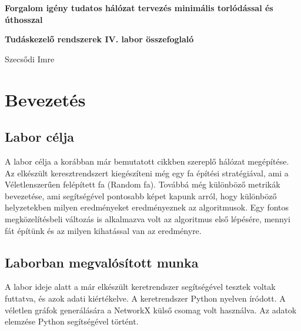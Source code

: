 \documentclass[12pt]{report}
\begin{document}
\begin{titlepage}
	\begin{center}
		\vspace*{1cm}
		
		\textbf{\LARGE 
			Forgalom igény tudatos hálózat tervezés minimális torlódással és úthosszal
		}
	
	
		\vspace{0.5cm}
	
		\textbf{\normalsize Tudáskezelő rendszerek IV. labor összefoglaló}
		
		\vfill
		
		\Large Szecsődi Imre
		
		\vspace{2.8cm}
		
		\the\year
		
	\end{center}
\end{titlepage}

\tableofcontents
	
\chapter{Bevezetés}


\section{Labor célja}

A labor célja a korábban már bemutatott cikkben\cite{avin_demand-aware_nodate} szereplő hálózat megépítése.
Az elkészült keresztrendszert kiegészíteni még egy fa építési stratégiával, ami a Véletlenszerűen felépített fa (Random fa).
Továbbá még különböző metrikák bevezetése, ami segítségével pontosabb képet kapunk arról, hogy különböző helyzetekben milyen eredményeket eredményeznek az algoritmusok.
Egy fontos megközelítésbeli változás is alkalmazva volt az algoritmus első lépésére, mennyi fát építünk és az milyen kihatással van az eredményre.

\section{Laborban megvalósított munka}

A labor ideje alatt a már elkészült keretrendszer segítségével tesztek voltak futtatva, és azok adati kiértékelve.
A keretrendszer Python \cite{noauthor_python_nodate} nyelven íródott.
A véletlen gráfok generálására a NetworkX külső csomag volt használva\cite{noauthor_networkx_nodate}.
Az adatok elemzése Python segítségével történt.
\end{document}
